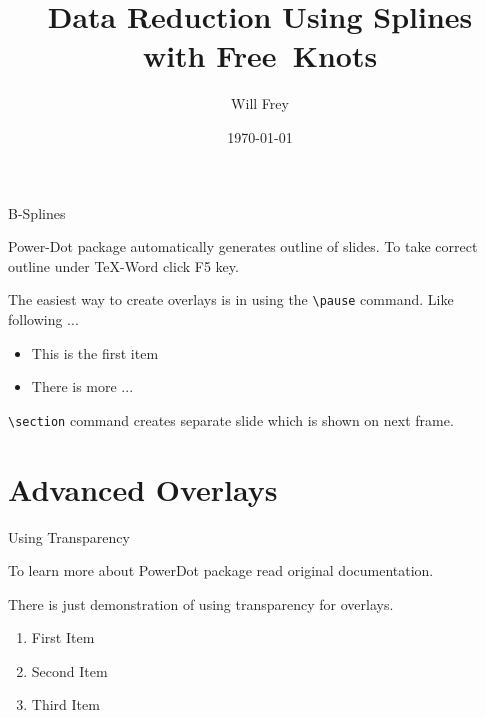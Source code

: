 \documentclass[style=sailor,size=14pt,display=slidesnotes]{powerdot}
\begin{document}
\title{Data Reduction Using Splines\\ with Free\ Knots}
\author{Will Frey}
\date{\today}
\maketitle

\begin{slide}{B-Splines}

  Power-Dot package automatically generates outline of slides.
  To take correct outline under \TeX-Word click F5 key.

  The easiest way to create overlays is in using 
  the \texttt{\textbackslash pause} command.
  Like following ...

  \begin{itemize}
    \item This is the first item\pause
    \item There is more ...
  \end{itemize}

  \texttt{\textbackslash section} command creates separate slide 
  which is shown on next frame.

\end{slide}

\section{Advanced Overlays}



\begin{slide}{Using Transparency}

  To learn more about PowerDot package 
  read original documentation.

  There is just demonstration of using transparency 
  for overlays.

  \begin{enumerate}[type=1]
    \item<1> First Item
    \item<2> Second Item
    \item<3> Third Item
  \end{enumerate}

\end{slide}
\end{document}
